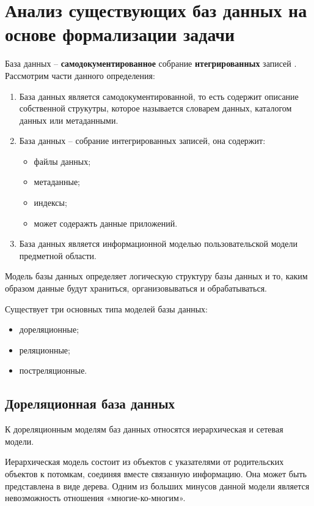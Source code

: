 \section{Анализ существующих баз данных на основе формализации задачи}
База данных -- \textbf{самодокументированное} собрание \textbf{нтегрированных} записей \cite{kranke}. Рассмотрим части данного определения:
\begin{enumerate}
    \item База данных является самодокументированной, то есть содержит описание собственной струкутры, которое называется 
    словарем данных, каталогом данных или метаданными.
    \item База данных -- собрание интегрированных записей, она содержит:
    \begin{itemize}
        \item файлы данных;
        \item метаданные;
        \item индексы;
        \item может содеражть данные приложений.
    \end{itemize}
    \item База данных является информационной моделью пользовательской модели предметной области.
\end{enumerate}

Модель базы данных определяет логическую структуру базы данных и то, каким образом данные будут храниться, организовываться
и обрабатываться.

Существует три основных типа моделей базы данных:
\begin{itemize}
    \item дореляционные;
    \item реляционные;
    \item постреляционные.
\end{itemize}

\subsection{Дореляционная база данных}

К дореляционным моделям баз данных относятся иерархическая и сетевая модели.

Иерархическая модель состоит из объектов с указателями от родительских объектов к потомкам, 
соединяя вместе связанную информацию. Она может быть представлена в виде дерева. Одним из больших минусов данной
модели является невозможность отношения «многие-ко-многим».

